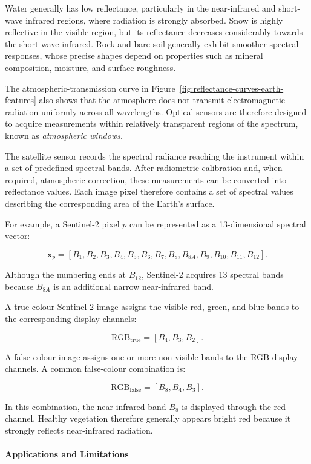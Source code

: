 \documentclass[11pt,a4paper]{article}
\begin{document}
Water generally has low reflectance, particularly in the near-infrared
and short-wave infrared regions, where radiation is strongly absorbed.
Snow is highly reflective in the visible region, but its reflectance
decreases considerably towards the short-wave infrared. Rock and bare
soil generally exhibit smoother spectral responses, whose precise shapes
depend on properties such as mineral composition, moisture, and surface
roughness.

The atmospheric-transmission curve in
Figure~\ref{fig:reflectance-curves-earth-features} also shows that the
atmosphere does not transmit electromagnetic radiation uniformly across
all wavelengths. Optical sensors are therefore designed to acquire
measurements within relatively transparent regions of the spectrum,
known as \textit{atmospheric windows}.

The satellite sensor records the spectral radiance reaching the
instrument within a set of predefined spectral bands. After radiometric
calibration and, when required, atmospheric correction, these
measurements can be converted into reflectance values. Each image pixel
therefore contains a set of spectral values describing the corresponding
area of the Earth's surface.

For example, a Sentinel-2 pixel \(p\) can be represented as a
13-dimensional spectral vector:

\[
\mathbf{x}_p =
\left[
B_1,
B_2,
B_3,
B_4,
B_5,
B_6,
B_7,
B_8,
B_{8A},
B_9,
B_{10},
B_{11},
B_{12}
\right].
\]

Although the numbering ends at \(B_{12}\), Sentinel-2 acquires 13
spectral bands because \(B_{8A}\) is an additional narrow
near-infrared band.

A true-colour Sentinel-2 image assigns the visible red, green, and blue
bands to the corresponding display channels:

\[
\mathrm{RGB}_{\mathrm{true}}
=
[B_4,B_3,B_2].
\]

A false-colour image assigns one or more non-visible bands to the RGB
display channels. A common false-colour combination is:

\[
\mathrm{RGB}_{\mathrm{false}}
=
[B_8,B_4,B_3].
\]

In this combination, the near-infrared band \(B_8\) is displayed through
the red channel. Healthy vegetation therefore generally appears bright
red because it strongly reflects near-infrared radiation.

\paragraph{Applications and Limitations}
\end{document}
